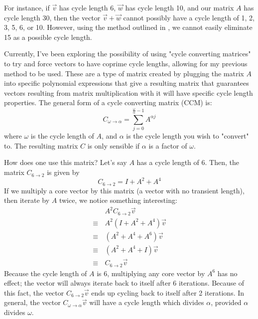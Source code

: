 \documentclass[a4paper, 12pt, reqno]{amsart}
\begin{document}
		For instance, if $\vec{v}$ has cycle length 6, $\vec{w}$ has cycle length 10, and our matrix $A$ has
		cycle length 30, then the vector $\vec{v} + \vec{w}$ cannot possibly have a cycle length of 1, 2, 3, 5, 6,
		or 10. However, using the method outlined in \citet{Strong2022maximal}, we cannot easily eliminate 15 as a possible
		cycle length.
		
		Currently, I've been exploring the possibility of using "cycle converting matrices" to try and force
		vectors to have coprime cycle lengths, allowing for my previous method to be used. These are a type of
		matrix created by plugging the matrix $A$ into specific polynomial expressions that give a resulting
		matrix that guarantees vectors resulting from matrix multiplication with it will have specific cycle
		length properties. The general form of a cycle converting matrix (CCM) is:
		\[
			C_{\omega \rightarrow \alpha} = \sum_{j=0}^{\frac{\omega}{\alpha} - 1} A^{\alpha j}
		\]
		where $\omega$ is the cycle length of $A$, and $\alpha$ is the cycle length you wish to "convert" to.
		The resulting matrix $C$ is only sensible if $\alpha$ is a factor of $\omega$.
		
		How does one use this matrix? Let's say $A$ has a cycle length of 6. Then, the matrix $C_{6 \rightarrow 2}$
		is given by
		\[
			C_{6 \rightarrow 2} = I + A^2 + A^4
		\]
		If we multiply a core vector by this matrix (a vector with no transient length), then iterate by $A$ 
		twice, we notice something interesting:
		\begin{align*}
			       & \, A^{2} C_{6 \rightarrow 2} \vec{v} \\
			\equiv & \, A^{2} (I + A^2 + A^4) \vec{v}     \\
			\equiv & \, (A^2 + A^4 + A^6) \vec{v}         \\
			\equiv & \, (A^2 + A^4 + I) \vec{v}           \\
			\equiv & \, C_{6 \rightarrow 2} \vec{v}
		\end{align*}
		Because the cycle length of $A$ is 6, multiplying any core vector by $A^6$ has no effect; the vector
		will always iterate back to itself after 6 iterations. Because of this fact, the vector 
		$C_{6 \rightarrow 2} \vec{v}$ ends up cycling back to itself after 2 iterations. In general, the
		vector $C_{\omega \rightarrow \alpha} \vec{v}$ will have a cycle length which divides $\alpha$, provided
		$\alpha$ divides $\omega$.
		
\end{document}
